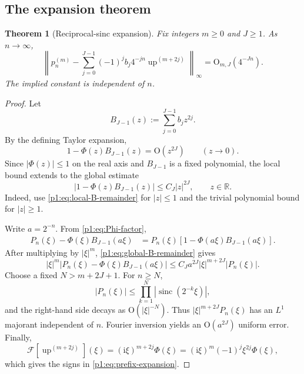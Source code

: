\documentclass[11pt]{article}
\numberwithin{equation}{section}
\newtheorem{theorem}{Theorem}[section]
\theoremstyle{definition}
\theoremstyle{remark}
\newcommand{\R}{\mathbb R}
\newcommand{\Up}{\operatorname{up}}
\newcommand{\sinc}{\operatorname{sinc}}
\newcommand{\ii}{\mathrm i}
\newcommand{\Oh}{\mathrm O}
\newcommand{\abs}[1]{\left|#1\right|}
\begin{document}
\subsection{The expansion theorem}

\begin{theorem}[Reciprocal-sinc expansion]
\label{p1:thm:prefix-expansion}
Fix integers $m\ge0$ and $J\ge1$.  As $n\to\infty$,
\begin{equation}
 \boxed{
 \left\|
 p_n^{(m)}-
 \sum_{j=0}^{J-1}(-1)^jb_j4^{-jn}\Up^{(m+2j)}
 \right\|_\infty
 =\Oh_{m,J}(4^{-Jn}).}
 \label{p1:eq:prefix-expansion}
\end{equation}
The implied constant is independent of $n$.
\end{theorem}

\begin{proof}
Let
\[
 B_{J-1}(z):=\sum_{j=0}^{J-1}b_jz^{2j}.
\]
By the defining Taylor expansion,
\begin{equation}
 1-\Phi(z)B_{J-1}(z)=\Oh(z^{2J})
 \qquad(z\to0).
 \label{p1:eq:local-B-remainder}
\end{equation}
Since $\abs{\Phi(z)}\le1$ on the real axis and $B_{J-1}$ is a fixed polynomial, the local bound extends to the global estimate
\begin{equation}
 \abs{1-\Phi(z)B_{J-1}(z)}\le C_J\abs z^{2J},
 \qquad z\in\R.
 \label{p1:eq:global-B-remainder}
\end{equation}
Indeed, use \eqref{p1:eq:local-B-remainder} for $\abs z\le1$ and the trivial polynomial bound for $\abs z\ge1$.

Write $a=2^{-n}$.  From \eqref{p1:eq:Phi-factor},
\begin{align}
 P_n(\xi)-\Phi(\xi)B_{J-1}(a\xi)
 &=P_n(\xi)\left[1-\Phi(a\xi)B_{J-1}(a\xi)\right].
 \label{p1:eq:Fourier-expansion-remainder}
\end{align}
After multiplying by $\abs\xi^m$, \eqref{p1:eq:global-B-remainder} gives
\begin{equation}
 \abs\xi^m
 \abs{P_n(\xi)-\Phi(\xi)B_{J-1}(a\xi)}
 \le C_Ja^{2J}\abs\xi^{m+2J}\abs{P_n(\xi)}.
 \label{p1:eq:Fourier-majorant}
\end{equation}
Choose a fixed $N>m+2J+1$.  For $n\ge N$,
\[
 \abs{P_n(\xi)}\le\prod_{k=1}^{N}\abs{\sinc(2^{-k}\xi)},
\]
and the right-hand side decays as $\Oh(\abs\xi^{-N})$.  Thus
\(\abs\xi^{m+2J}P_n(\xi)\) has an $L^1$ majorant independent of $n$.  Fourier inversion yields an $\Oh(a^{2J})$ uniform error.  Finally,
\[
 \mathcal F[\Up^{(m+2j)}](\xi)
 =(\ii\xi)^{m+2j}\Phi(\xi)
 =(\ii\xi)^m(-1)^j\xi^{2j}\Phi(\xi),
\]
which gives the signs in \eqref{p1:eq:prefix-expansion}.
\end{proof}
\end{document}
